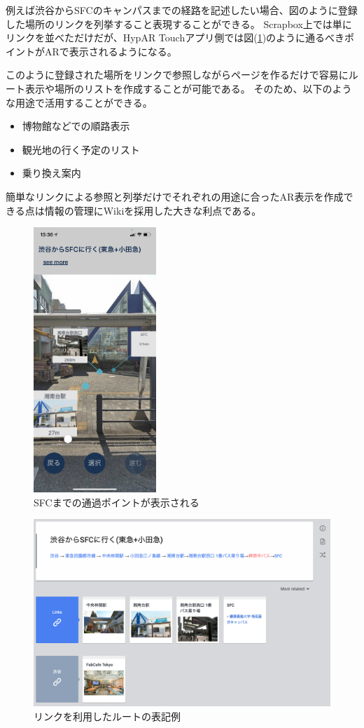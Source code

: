 例えば渋谷からSFCのキャンパスまでの経路を記述したい場合、図のように登録した場所のリンクを列挙すること表現することができる。
Scrapbox上では単にリンクを並べただけだが、HypAR Touchアプリ側では図(\ref{fig:ar_route_sfc})のように通るべきポイントがARで表示されるようになる。

このように登録された場所をリンクで参照しながらページを作るだけで容易にルート表示や場所のリストを作成することが可能である。
そのため、以下のような用途で活用することができる。

\begin{itemize}
  \item 博物館などでの順路表示
  \item 観光地の行く予定のリスト
  \item 乗り換え案内
\end{itemize}

簡単なリンクによる参照と列挙だけでそれぞれの用途に合ったAR表示を作成できる点は情報の管理にWikiを採用した大きな利点である。

\begin{figure}[H]
  \centering
  \includegraphics[height=100mm]{images/ar_route_sfc.png}
  \caption{SFCまでの通過ポイントが表示される} \label{fig:ar_route_sfc}
\end{figure}


\begin{figure}[H]
  \centering
  \includegraphics[width=150mm]{images/route_scrapbox.png}
  \caption{リンクを利用したルートの表記例} \label{fig:route_scrapbox}
\end{figure}


